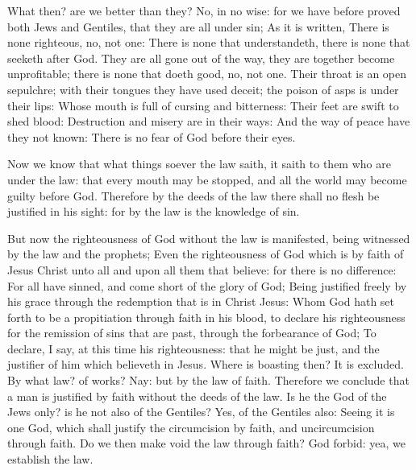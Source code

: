  What then? are we better than they? No, in no wise: for
we have before proved both Jews and Gentiles, that they are all under
sin;  As it is written, There is none righteous, no, not
one:  There is none that understandeth, there is none
that seeketh after God.  They are all gone out of the
way, they are together become unprofitable; there is none that doeth
good, no, not one.  Their throat is an open sepulchre;
with their tongues they have used deceit; the poison of asps is under
their lips:  Whose mouth is full of cursing and
bitterness:  Their feet are swift to shed blood:
 Destruction and misery are in their ways:
 And the way of peace have they not known:
 There is no fear of God before their eyes.

 Now we know that what things soever the law saith, it
saith to them who are under the law: that every mouth may be stopped,
and all the world may become guilty before God. 
Therefore by the deeds of the law there shall no flesh be justified in
his sight: for by the law is the knowledge of sin.

 But now the righteousness of God without the law is
manifested, being witnessed by the law and the prophets; 
Even the righteousness of God which is by faith of Jesus Christ unto all
and upon all them that believe: for there is no difference:
 For all have sinned, and come short of the glory of God;
 Being justified freely by his grace through the
redemption that is in Christ Jesus:  Whom God hath set
forth to be a propitiation through faith in his blood, to declare his
righteousness for the remission of sins that are past, through the
forbearance of God;  To declare, I say, at this time his
righteousness: that he might be just, and the justifier of him which
believeth in Jesus.  Where is boasting then? It is
excluded. By what law? of works? Nay: but by the law of faith.
 Therefore we conclude that a man is justified by faith
without the deeds of the law.  Is he the God of the Jews
only? is he not also of the Gentiles? Yes, of the Gentiles also:
 Seeing it is one God, which shall justify the
circumcision by faith, and uncircumcision through faith. 
Do we then make void the law through faith? God forbid: yea, we
establish the law.

